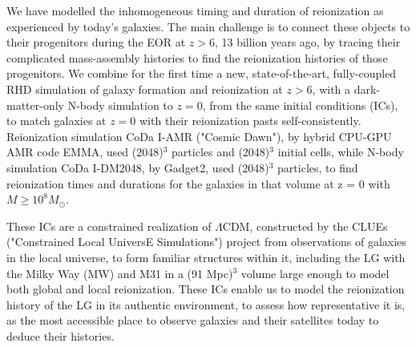 \documentclass[twocolumn]{aastex61}
\begin{document}
We have modelled the inhomogeneous timing and duration of reionization as experienced by today's galaxies. The main challenge is to connect these objects to their progenitors during the EOR at $z > 6$, 13 billion years ago, by tracing their complicated mass-assembly histories to find the reionization histories of those progenitors. 
We combine for the first time a new, state-of-the-art, fully-coupled RHD simulation of galaxy formation and reionization at $z > 6$, with a dark-matter-only N-body simulation to $z = 0$, 
from the same initial conditions (ICs), to match galaxies at $z = 0$ with their reionization pasts self-consistently.
Reionization simulation CoDa I-AMR ("Cosmic Dawn"), by hybrid CPU-GPU AMR code EMMA, used (2048)$^3$ particles and (2048)$^3$ initial cells, while N-body simulation CoDa I-DM2048, by Gadget2, used (2048)$^3$ particles, to find reionization times and durations for the galaxies in that volume at z = 0 with  $M\ge 10^8 M_\odot$. 

 These ICs are a constrained realization of $\Lambda$CDM, constructed by the CLUEs ("Constrained Local UniversE Simulations") project from observations of galaxies in the local universe, to form familiar structures within it, including the LG with the Milky Way (MW) and M31 in a (91 Mpc)$^3$ volume large enough to model both global and local reionization. 
 These ICs enable us to model the reionization history
 of the LG in its authentic environment, to assess how representative it is, as the most accessible place to observe galaxies and their satellites today to deduce their histories.  


\end{document}
